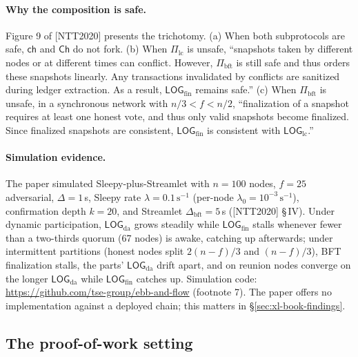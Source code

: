 \documentclass[11pt,a4paper]{article}
\theoremstyle{definition}
\begin{document}
\paragraph{Why the composition is safe.} Figure 9 of [NTT2020] presents
the trichotomy. (a) When both subprotocols are safe, $\mathsf{ch}$ and
$\mathsf{Ch}$ do not fork. (b) When $\Pi_{\mathrm{lc}}$ is unsafe,
``snapshots taken by different nodes or at different times can conflict.
However, $\Pi_{\mathrm{bft}}$ is still safe and thus orders these
snapshots linearly. Any transactions invalidated by conflicts are
sanitized during ledger extraction. As a result,
$\mathsf{LOG}_{\mathrm{fin}}$ remains safe.'' (c) When
$\Pi_{\mathrm{bft}}$ is unsafe, in a synchronous network with
$n/3 < f < n/2$, ``finalization of a snapshot requires at least one honest
vote, and thus only valid snapshots become finalized. Since finalized
snapshots are consistent, $\mathsf{LOG}_{\mathrm{fin}}$ is consistent with
$\mathsf{LOG}_{\mathrm{lc}}$.''

\paragraph{Simulation evidence.} The paper simulated Sleepy-plus-Streamlet
with $n = 100$ nodes, $f = 25$ adversarial, $\Delta = 1\,$s, Sleepy rate
$\lambda = 0.1\,\mathrm{s}^{-1}$ (per-node $\lambda_0 =
10^{-3}\,\mathrm{s}^{-1}$), confirmation depth $k = 20$, and Streamlet
$\Delta_{\mathrm{bft}} = 5\,$s ([NTT2020] \S\,IV). Under dynamic participation,
$\mathsf{LOG}_{\mathrm{da}}$ grows steadily while
$\mathsf{LOG}_{\mathrm{fin}}$ stalls whenever fewer than a two-thirds
quorum (67 nodes) is awake, catching up afterwards; under intermittent
partitions (honest nodes split $2(n-f)/3$ and $(n-f)/3$), BFT finalization
stalls, the parts' $\mathsf{LOG}_{\mathrm{da}}$ drift apart, and on
reunion nodes converge on the longer $\mathsf{LOG}_{\mathrm{da}}$ while
$\mathsf{LOG}_{\mathrm{fin}}$ catches up. Simulation code:
\url{https://github.com/tse-group/ebb-and-flow} (footnote 7). The paper
offers no implementation against a deployed chain; this matters in
\S\ref{sec:xl-book-findings}.

\subsection{The proof-of-work setting}\label{sec:xl-pow-setting}
\end{document}

